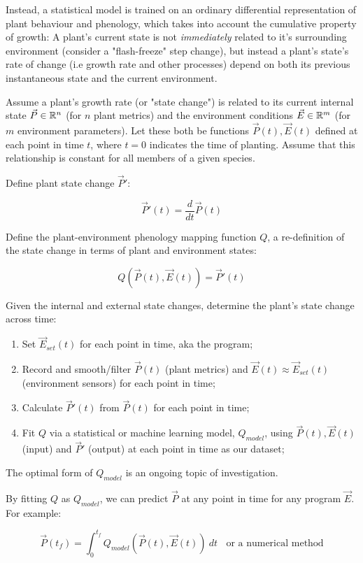 \documentclass{report}
\begin{document}
Instead, a statistical model is trained on an ordinary differential representation of plant behaviour and phenology, which takes into account the cumulative property of growth: A plant's current state is not \textit{immediately} related to it's surrounding environment (consider a "flash-freeze" step change), but instead a plant's state's rate of change (i.e growth rate and other processes) depend on both its previous instantaneous state and the current environment.

Assume a plant's growth rate (or "state change") is related to its current internal state $\vec P \in \mathbb R^n$ (for $n$ plant metrics) and the environment conditions $\vec E \in \mathbb R^m$ (for $m$ environment parameters). Let these both be functions $\vec P (t),\vec E(t)$ defined at each point in time $t$, where $t=0$ indicates the time of planting. Assume that this relationship is constant for all members of a given species.

Define plant state change $\vec P'$: 

$$\vec P'(t) = \frac{d}{dt}\vec P(t)$$

Define the plant-environment phenology mapping function $Q$, a re-definition of the state change in terms of plant and environment states: 

$$Q(\vec P(t), \vec E(t))=\vec P'(t)$$ 

Given the internal and external state changes, determine the plant's state change across time:

\begin{enumerate}
    \item Set $\vec E_{set}(t)$ for each point in time, aka the program;
    \item Record and smooth/filter $\vec P(t)$ (plant metrics) and $\vec E(t)\approx \vec E_{set}(t)$ (environment sensors) for each point in time;
    \item Calculate $\vec P'(t)$ from $\vec P(t)$ for each point in time;
    \item Fit $Q$ via a statistical or machine learning model, $Q_{model}$, using $\vec P(t),\vec E(t)$ (input) and $\vec P'$ (output) at each point in time as our dataset;
\end{enumerate}

The optimal form of $Q_{model}$ is an ongoing topic of investigation.

By fitting $Q$ as $Q_{model}$, we can predict $\vec P$ at any point in time for any program $\vec E$. For example:

$$\vec P(t_f)=\int_0^{t_f}Q_{model}(\vec P(t),\vec E(t))~dt~~~~\text{or a numerical method}$$

\newpage



\end{document}
